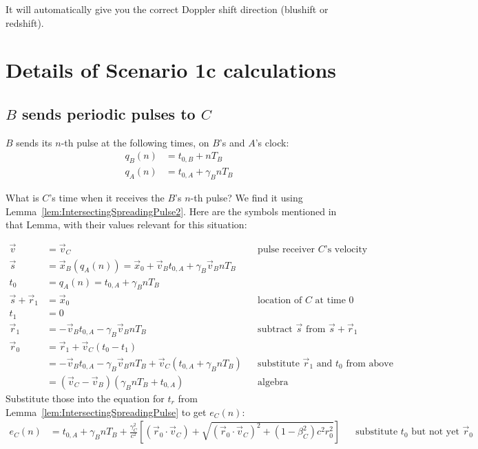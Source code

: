 \documentclass[a4paper]{article}
\theoremstyle{plain}
\theoremstyle{definition}
\newcommand{\vect}[1]{\vec{#1}}
\begin{document}
It will automatically give you the correct Doppler shift direction
(blushift or redshift).


\section{Details of Scenario 1c calculations}
\label{app:scen1c}


\subsection{$B$ sends periodic pulses to $C$}
\label{app:scen1c-Bsending}

$B$ sends its $n$-th pulse at the following times, on $B$'s and $A$'s
clock:
\begin{align}
q_B(n) & = t_{0,B} + nT_B \\
q_A(n) & = t_{0,A} + \gamma_B nT_B
\end{align}

What is $C$'s time when it receives the $B$'s $n$-th pulse?  We find
it using Lemma~\ref{lem:IntersectingSpreadingPulse2}.  Here are the
symbols mentioned in that Lemma, with their values relevant for this
situation:

\begin{align*}
\vect{v} & = \vect{v}_C & & \text{pulse receiver $C$'s velocity} \\
\vect{s} & = \vect{x}_B(q_A(n)) = \vect{x}_0 + \vect{v}_B t_{0,A} + \gamma_B \vect{v}_B n T_B  & & \text{} \\
t_0 & = q_A(n) = t_{0,A} + \gamma_B nT_B & & \text{} \\
\vect{s} + \vect{r}_1 & = \vect{x}_0 & & \text{location of $C$ at time 0} \\
t_1 & = 0 \\
\vect{r}_1 & = - \vect{v}_B t_{0,A} - \gamma_B \vect{v}_B n T_B & & \text{subtract $\vect{s}$ from $\vect{s}+\vect{r}_1$} \\
\vect{r}_0
  & = \vect{r}_1 + \vect{v}_C(t_0-t_1) \\
  & = - \vect{v}_B t_{0,A} - \gamma_B \vect{v}_B n T_B + \vect{v}_C (t_{0,A} + \gamma_B nT_B) & & \text{substitute $\vect{r}_1$ and $t_0$ from above} \\
  & = (\vect{v}_C - \vect{v}_B) (\gamma_B n T_B + t_{0,A}) & & \text{algebra}
\end{align*}
Substitute those into the equation for $t_r$ from
Lemma~\ref{lem:IntersectingSpreadingPulse} to get $e_{C}(n)$:
\begin{align*}
e_{C}(n) & = t_{0,A} + \gamma_B nT_B + \frac{\gamma_C^2}{c^2} \left[ (\vect{r}_0 \cdot \vect{v}_C) + \sqrt{(\vect{r}_0 \cdot \vect{v}_C)^2 + (1-\beta_C^2)c^2 r_0^2} \right] & & \text{substitute $t_0$ but not yet $\vect{r}_0$}
\end{align*}
\end{document}
